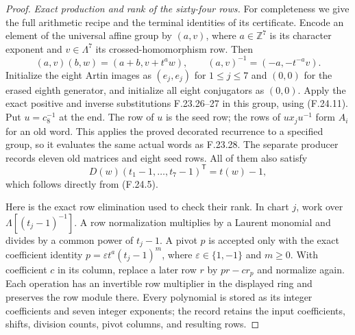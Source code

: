 \begin{proof}
\emph{Exact production and rank of the sixty-four rows.}
For completeness we give the full arithmetic recipe
and the terminal identities of its certificate. Encode
an element of the universal affine group by $(a,v)$,
where $a\in\mathbb Z^7$ is its character exponent and
$v\in\Lambda^7$ its crossed-homomorphism row. Then
\[
 (a,v)(b,w)=(a+b,v+t^a w),\qquad
 (a,v)^{-1}=(-a,-t^{-a}v).                                    \tag{F.24.11}
\]
Initialize the eight Artin images as $(e_j,e_j)$ for
$1\leq j\leq7$ and $(0,0)$ for the erased eighth
generator, and initialize all eight conjugators as
$(0,0)$. Apply the exact positive and inverse substitutions
F.23.26--27 in this group, using (F.24.11). Put
$u=c_8^{-1}$ at the end. The row of $u$ is the seed row;
the rows of $u x_j u^{-1}$ form $A_i$ for an old word.
This applies the proved decorated recurrence to a
specified group, so it evaluates the same actual
words as F.23.28. The separate producer records
eleven old matrices and eight seed rows. All of them
also satisfy
\[
 D(w)(t_1-1,\ldots,t_7-1)^{\mathsf T}=t(w)-1,                 \tag{F.24.12}
\]
which follows directly from (F.24.5).

Here is the exact row elimination used to check their
rank. In chart $j$, work over
$\Lambda[(t_j-1)^{-1}]$. A row normalization multiplies
by a Laurent monomial and divides by a common power of
$t_j-1$. A pivot $p$ is accepted only with the exact
coefficient identity
$p=\varepsilon t^a(t_j-1)^m$, where
$\varepsilon\in\{1,-1\}$ and $m\geq0$. With coefficient
$c$ in its column, replace a later row $r$ by $pr-c r_p$
and normalize again. Each operation has an invertible
row multiplier in the displayed ring and preserves
the row module there. Every polynomial is stored as
its integer coefficients and seven integer exponents;
the record retains the input coefficients, shifts,
division counts, pivot columns, and resulting rows.


\end{proof}
